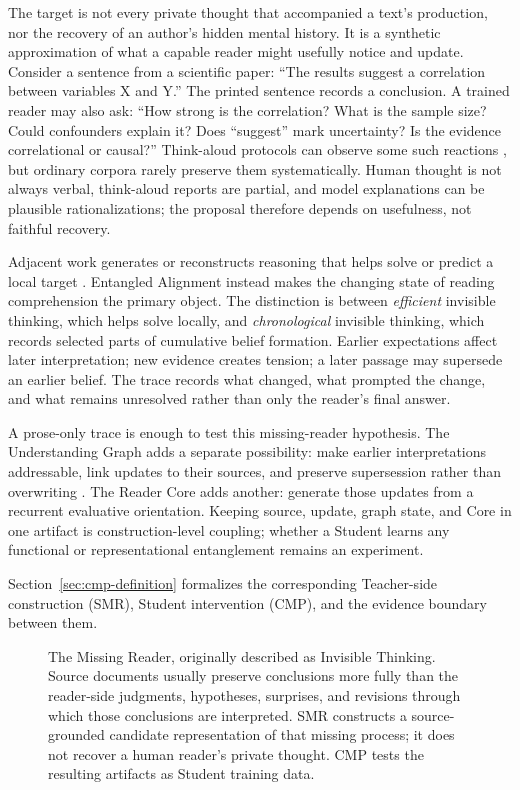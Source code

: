 \documentclass[11pt]{article}
\begin{document}
The target is not every private thought that accompanied a text's production,
nor the recovery of an author's hidden mental history. It is a synthetic
approximation of what a capable reader might usefully notice and update. Consider
a sentence from a scientific paper: ``The results suggest a correlation between
variables X and Y.'' The printed sentence records a conclusion. A trained reader
may also ask: ``How strong is the correlation? What is the sample size? Could
confounders explain it? Does ``suggest'' mark uncertainty? Is the evidence
correlational or causal?'' Think-aloud protocols can observe some such reactions
\cite{ericsson1984protocol}, but ordinary corpora rarely preserve them
systematically. Human thought is not always verbal, think-aloud reports are
partial, and model explanations can be plausible rationalizations; the proposal
therefore depends on usefulness, not faithful recovery.

Adjacent work generates or reconstructs reasoning that helps solve or predict a
local target \cite{nye2021scratchpads,zelikman2022star,zelikman2024quietstar}.
Entangled Alignment instead makes the changing state of reading comprehension
the primary object. The distinction is between \emph{efficient} invisible
thinking, which helps solve locally, and \emph{chronological} invisible thinking,
which records selected parts of cumulative belief formation. Earlier
expectations affect later interpretation; new evidence creates tension; a later
passage may supersede an earlier belief. The trace records what changed, what
prompted the change, and what remains unresolved rather than only the reader's
final answer.

A prose-only trace is enough to test this missing-reader hypothesis. The
Understanding Graph adds a separate possibility: make earlier interpretations
addressable, link updates to their sources, and preserve supersession rather
than overwriting \cite{westerberg2026understanding}. The Reader Core adds another:
generate those updates from a recurrent evaluative orientation. Keeping source,
update, graph state, and Core in one artifact is construction-level coupling;
whether a Student learns any functional or representational entanglement remains
an experiment.

Section~\ref{sec:cmp-definition} formalizes the corresponding Teacher-side
construction (SMR), Student intervention (CMP), and the evidence boundary between
them.

\begin{figure}[h]
    \centering
    \resizebox{0.985\textwidth}{!}{}
    \caption{The Missing Reader, originally described as Invisible Thinking. Source documents usually preserve conclusions more fully than the reader-side judgments, hypotheses, surprises, and revisions through which those conclusions are interpreted. SMR constructs a source-grounded candidate representation of that missing process; it does not recover a human reader's private thought. CMP tests the resulting artifacts as Student training data.}
    \label{fig:invisible-thinking}
\end{figure}
\end{document}
